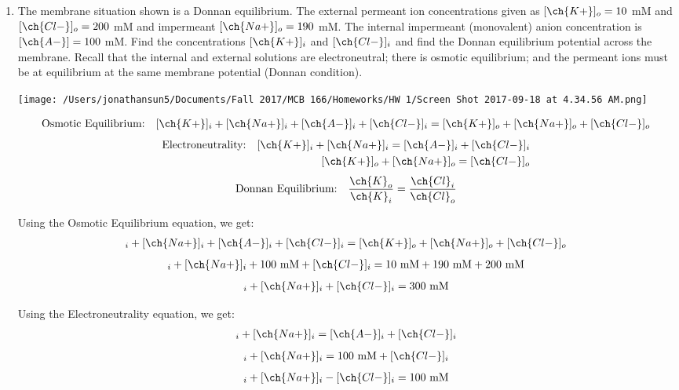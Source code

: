 \documentclass[11pt]{article}
\begin{document}
\begin{enumerate}[label=\arabic*.]
\newpage
\item
The membrane situation shown is a Donnan equilibrium. The external permeant ion concentrations given as $[\ch{K+}]_o = 10$ mM and $[\ch{Cl-}]_o = 200$ mM and impermeant $[\ch{Na+}]_o = 190$ mM. The internal impermeant (monovalent) anion concentration is $[\ch{A-}] = 100$ mM. Find the concentrations $[\ch{K+}]_i$ and $[\ch{Cl-}]_i$ and find the Donnan equilibrium potential across the membrane. Recall that the internal and external solutions are electroneutral; there is osmotic equilibrium; and the permeant ions must be at equilibrium at the same membrane potential (Donnan condition).
\begin{center}
\texttt{[image: /Users/jonathansun5/Documents/Fall 2017/MCB 166/Homeworks/HW 1/Screen Shot 2017-09-18 at 4.34.56 AM.png]}
\end{center}
\begin{align*}
\text{Osmotic Equilibrium:} && [\ch{K+}]_i + [\ch{Na+}]_i + [\ch{A-}]_i + [\ch{Cl-}]_i = [\ch{K+}]_o + [\ch{Na+}]_o + [\ch{Cl-}]_o
\end{align*}
\begin{align*}
\text{Electroneutrality:} && [\ch{K+}]_i + [\ch{Na+}]_i = [\ch{A-}]_i + [\ch{Cl-}]_i \\
&& [\ch{K+}]_o + [\ch{Na+}]_o = [\ch{Cl-}]_o
\end{align*}
\begin{align*}
\text{Donnan Equilibrium:} &&  \frac{\ch{K}_o} {\ch{K}_i} = \frac{\ch{Cl}_i} {\ch{Cl}_o}
\end{align*}

Using the Osmotic Equilibrium equation, we get:
\begin{align*}
[\ch{K+}]_i + [\ch{Na+}]_i + [\ch{A-}]_i + [\ch{Cl-}]_i = [\ch{K+}]_o + [\ch{Na+}]_o + [\ch{Cl-}]_o
\end{align*}
\begin{align*}
[\ch{K+}]_i + [\ch{Na+}]_i + 100 \text{ mM} + [\ch{Cl-}]_i = 10 \text{ mM} + 190 \text{ mM} + 200 \text{ mM}
\end{align*}
\begin{align*}
[\ch{K+}]_i + [\ch{Na+}]_i + [\ch{Cl-}]_i = 300 \text{ mM}
\end{align*}

Using the Electroneutrality equation, we get:
\begin{align*}
[\ch{K+}]_i + [\ch{Na+}]_i = [\ch{A-}]_i + [\ch{Cl-}]_i
\end{align*}
\begin{align*}
[\ch{K+}]_i + [\ch{Na+}]_i = 100 \text{ mM} + [\ch{Cl-}]_i
\end{align*}
\begin{align*}
[\ch{K+}]_i + [\ch{Na+}]_i - [\ch{Cl-}]_i= 100 \text{ mM}
\end{align*}


\end{enumerate}
\end{document}
